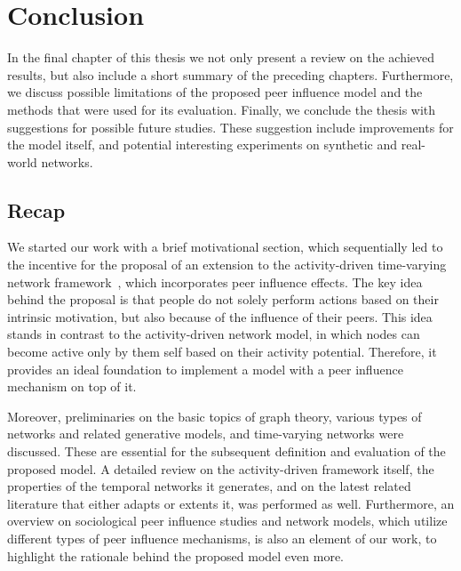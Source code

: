 \chapter{Conclusion}
\label{cha:conclusion}

In the final chapter of this thesis we not only present a review on the achieved results, but also include a short summary of the preceding chapters.
Furthermore, we discuss possible limitations of the proposed peer influence model and the methods that were used for its evaluation.
Finally, we conclude the thesis with suggestions for possible future studies.
These suggestion include improvements for the model itself, and potential interesting experiments on synthetic and real-world networks.




\section{Recap}
\label{sec:recap}

We started our work with a brief motivational section, which sequentially led to the incentive for the proposal of an extension to the activity-driven time-varying network framework~\cite{Perra2012a}, which incorporates peer influence effects.
The key idea behind the proposal is that people do not solely perform actions based on their intrinsic motivation, but also because of the influence of their peers.
This idea stands in contrast to the activity-driven network model, in which nodes can become active only by them self based on their activity potential.
Therefore, it provides an ideal foundation to implement a model with a peer influence mechanism on top of it.

Moreover, preliminaries on the basic topics of graph theory, various types of networks and related generative models, and time-varying networks were discussed.
These are essential for the subsequent definition and evaluation of the proposed model.
A detailed review on the activity-driven framework itself, the properties of the temporal networks it generates, and on the latest related literature that either adapts or extents it, was performed as well.
Furthermore, an overview on sociological peer influence studies and network models, which utilize different types of peer influence mechanisms, is also an element of our work, to highlight the rationale behind the proposed model even more.


